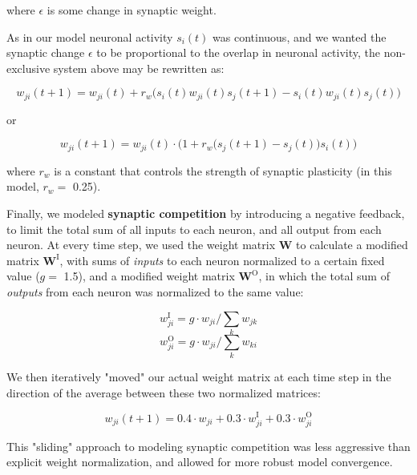 \documentclass{article}
\begin{document}
where $\epsilon$ is some change in synaptic weight. 

As in our model neuronal activity $s_i(t)$ was continuous, and we wanted the synaptic change $\epsilon$ to be proportional to the overlap in neuronal activity, the non-exclusive system above may be rewritten as:

\[ w_{ji}(t+1) = w_{ji}(t) + r_w \big(s_i(t)w_{ji}(t)s_j(t+1) - s_i(t)w_{ji}(t)s_j(t)\big) \]

or

\[ w_{ji}(t+1) = w_{ji}(t)\cdot\Big(1+r_w\big(s_j(t+1)-s_j(t)\big)s_i(t)\Big) \]

where $r_w$ is a constant that controls the strength of synaptic plasticity (in this model, $r_w=$ 0.25).

Finally, we modeled \textbf{synaptic competition} by introducing a negative feedback, to limit the total sum of all inputs to each neuron, and all output from each neuron. At every time step, we used the weight matrix $\textbf{W}$ to calculate a modified matrix $\textbf{W}^\text{I}$, with sums of \textit{inputs} to each neuron normalized to a certain fixed value ($g=$ 1.5), and a modified weight matrix $\textbf{W}^\text{O}$, in which the total sum of \textit{outputs} from each neuron was normalized to the same value: 

\[ w_{ji}^\text{I} = g \cdot w_{ji}/\sum_k{w_{jk}} \]
\[ w_{ji}^\text{O} = g \cdot w_{ji}/\sum_k{w_{ki}} \]

We then iteratively "moved" our actual weight matrix at each time step in the direction of the average between these two normalized matrices:

\[ w_{ji}(t+1) = 0.4 \cdot w_{ji} + 0.3 \cdot w^\text{I}_{ji} + 0.3 \cdot w^\text{O}_{ji} \]

This "sliding" approach to modeling synaptic competition was less aggressive than explicit weight normalization, and allowed for more robust model convergence.
\end{document}
